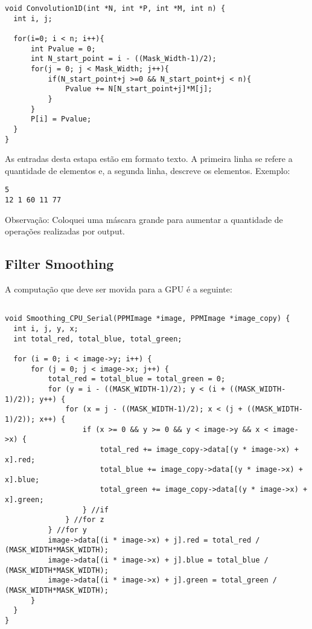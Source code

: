 \documentclass[12pt,a4paper,notitlepage]{report}
\begin{document}
\begin{lstlisting}[basicstyle=\tiny]
void Convolution1D(int *N, int *P, int *M, int n) {
  int i, j;

  for(i=0; i < n; i++){
      int Pvalue = 0;
      int N_start_point = i - ((Mask_Width-1)/2);
      for(j = 0; j < Mask_Width; j++){
          if(N_start_point+j >=0 && N_start_point+j < n){
              Pvalue += N[N_start_point+j]*M[j];
          }
      }
      P[i] = Pvalue;
  }
}
\end{lstlisting}

As entradas desta estapa estão em formato texto. A primeira linha se refere a quantidade de elementos e, a segunda linha, descreve os elementos. Exemplo:
\begin{lstlisting}
5
12 1 60 11 77

\end{lstlisting}

Observação: Coloquei uma máscara grande para aumentar a quantidade de operações realizadas por output.

\subsection*{Filter Smoothing}

A computação que deve ser movida para a GPU é a seguinte:

\begin{lstlisting}[basicstyle=\tiny]

void Smoothing_CPU_Serial(PPMImage *image, PPMImage *image_copy) {
  int i, j, y, x;
  int total_red, total_blue, total_green;

  for (i = 0; i < image->y; i++) {
      for (j = 0; j < image->x; j++) {
          total_red = total_blue = total_green = 0;
          for (y = i - ((MASK_WIDTH-1)/2); y < (i + ((MASK_WIDTH-1)/2)); y++) {
              for (x = j - ((MASK_WIDTH-1)/2); x < (j + ((MASK_WIDTH-1)/2)); x++) {
                  if (x >= 0 && y >= 0 && y < image->y && x < image->x) {
                      total_red += image_copy->data[(y * image->x) + x].red;
                      total_blue += image_copy->data[(y * image->x) + x].blue;
                      total_green += image_copy->data[(y * image->x) + x].green;
                  } //if
              } //for z
          } //for y
          image->data[(i * image->x) + j].red = total_red / (MASK_WIDTH*MASK_WIDTH);
          image->data[(i * image->x) + j].blue = total_blue / (MASK_WIDTH*MASK_WIDTH);
          image->data[(i * image->x) + j].green = total_green / (MASK_WIDTH*MASK_WIDTH);
      }
  }
}
\end{lstlisting}
\end{document}
